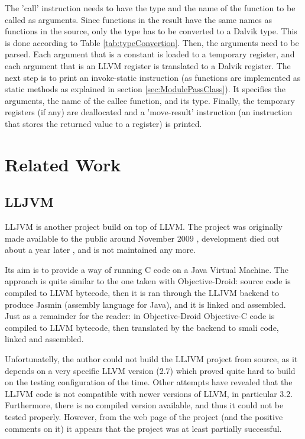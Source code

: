 \documentclass[parskip]{cs4rep}
\begin{document}
The 'call' instruction needs to have the type and the name of the function to be called as arguments. Since functions in the result have the same names as functions in the source, only the type has to be converted to a Dalvik type. This is done according to Table \ref{tab:typeConvertion}. Then, the arguments need to be parsed. Each argument that is a constant is loaded to a temporary register, and each argument that is an LLVM register is translated to a Dalvik register. The next step is to print an invoke-static instruction (as functions are implemented as static methods as explained in section \ref{sec:ModulePassClass}). It specifies the arguments, the name of the callee function, and its type. Finally, the temporary registers (if any) are deallocated and a 'move-result' instruction (an instruction that stores the returned value to a register) is printed.

\chapter{Related Work}

\section{LLJVM}

LLJVM is another project build on top of LLVM. The project was originally made available to the public around November 2009 \cite{P12}, development died out about a year later \cite{P13}, and is not maintained any more.

Its aim is to provide a way of running C code on a Java Virtual Machine. The approach is quite similar to the one taken with Objective-Droid: source code is compiled to LLVM bytecode, then it is ran through the LLJVM backend to produce Jasmin (assembly language for Java), and it is linked and assembled. Just as a remainder for the reader: in Objective-Droid Objective-C code is compiled to LLVM bytecode, then translated by the backend to smali code, linked and assembled.

Unfortunatelly, the author could not build the LLJVM project from source, as it depends on a very specific LLVM version (2.7) which proved quite hard to build on the testing configuration of the time. Other attempts have revealed that the LLJVM code is not compatible with newer versions of LLVM, in particular 3.2. Furthermore, there is no compiled version available, and thus it could not be tested properly. However, from the web page of the project (and the positive comments on it) it appears that the project was at least partially successful.
\end{document}
